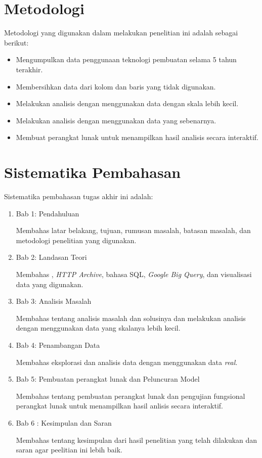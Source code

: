 \section{Metodologi}
\label{sec:metlit}
Metodologi yang digunakan dalam melakukan penelitian ini adalah sebagai berikut:
\begin{itemize}
    \item Mengumpulkan data penggunaan teknologi pembuatan \web selama 5 tahun terakhir.
    \item Membersihkan data dari kolom dan baris yang tidak digunakan.
    \item Melakukan analisis dengan menggunakan data dengan skala lebih kecil.
    \item Melakukan analisis dengan menggunakan data yang sebenarnya.
    \item Membuat perangkat lunak untuk menampilkan hasil analisis secara interaktif.
\end{itemize}

\section{Sistematika Pembahasan}
\label{sec:sispem}
Sistematika pembahasan tugas akhir ini adalah:
\begin{enumerate}
    \item Bab 1: Pendahuluan
   
    Membahas latar belakang, tujuan, rumusan masalah, batasan masalah, dan metodologi penelitian yang digunakan.
    
    \item Bab 2: Landasan Teori

    Membahas \web, \textit{HTTP Archive}, bahasa SQL, \textit{Google Big Query}, dan visualisasi data yang digunakan.

    \item Bab 3: Analisis Masalah

    Membahas tentang analisis masalah dan solusinya dan melakukan analisis dengan menggunakan data yang skalanya lebih kecil.

    \item Bab 4: Penambangan Data
    
    Membahas eksplorasi dan analisis data dengan menggunakan data \textit{real}.

    \item Bab 5: Pembuatan perangkat lunak dan Peluncuran Model

    Membahas tentang pembuatan perangkat lunak dan pengujian fungsional perangkat lunak untuk menampilkan hasil anlisis secara interaktif.

    \item Bab 6 : Kesimpulan dan Saran

    Membahas tentang kesimpulan dari hasil penelitian yang telah dilakukan dan saran agar peelitian ini lebih baik.
\end{enumerate}
